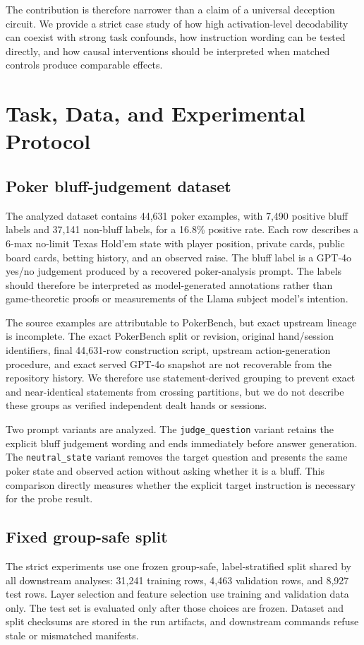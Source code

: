 The contribution is therefore narrower than a claim of a universal deception circuit. We provide a strict case study of how high activation-level decodability can coexist with strong task confounds, how instruction wording can be tested directly, and how causal interventions should be interpreted when matched controls produce comparable effects.

\section{Task, Data, and Experimental Protocol}
\subsection{Poker bluff-judgement dataset}
The analyzed dataset contains 44,631 poker examples, with 7,490 positive bluff labels and 37,141 non-bluff labels, for a 16.8\% positive rate. Each row describes a 6-max no-limit Texas Hold'em state with player position, private cards, public board cards, betting history, and an observed raise. The bluff label is a GPT-4o yes/no judgement produced by a recovered poker-analysis prompt. The labels should therefore be interpreted as model-generated annotations rather than game-theoretic proofs or measurements of the Llama subject model's intention.

The source examples are attributable to PokerBench, but exact upstream lineage is incomplete. The exact PokerBench split or revision, original hand/session identifiers, final 44,631-row construction script, upstream action-generation procedure, and exact served GPT-4o snapshot are not recoverable from the repository history. We therefore use statement-derived grouping to prevent exact and near-identical statements from crossing partitions, but we do not describe these groups as verified independent dealt hands or sessions.

Two prompt variants are analyzed. The \texttt{judge\_question} variant retains the explicit bluff judgement wording and ends immediately before answer generation. The \texttt{neutral\_state} variant removes the target question and presents the same poker state and observed action without asking whether it is a bluff. This comparison directly measures whether the explicit target instruction is necessary for the probe result.

\subsection{Fixed group-safe split}
The strict experiments use one frozen group-safe, label-stratified split shared by all downstream analyses: 31,241 training rows, 4,463 validation rows, and 8,927 test rows. Layer selection and feature selection use training and validation data only. The test set is evaluated only after those choices are frozen. Dataset and split checksums are stored in the run artifacts, and downstream commands refuse stale or mismatched manifests.

